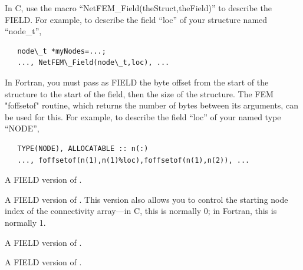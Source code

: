 \documentclass[10pt]{article}
\begin{document}
In C, use the macro ``NetFEM\_Field(theStruct,theField)''
to describe the FIELD.  For example, to describe
the field ``loc'' of your structure named ``node\_t'',

\begin{verbatim}
   node\_t *myNodes=...;
   ..., NetFEM\_Field(node\_t,loc), ...
\end{verbatim}


In Fortran, you must pass as FIELD the byte offset from the start 
of the structure to the start of the field,
then the size of the structure.  The FEM "foffsetof" routine,
which returns the number of bytes between its arguments,
can be used for this.  For example, to describe the field
``loc'' of your named type ``NODE'',

\begin{verbatim}
   TYPE(NODE), ALLOCATABLE :: n(:)
   ..., foffsetof(n(1),n(1)%loc),foffsetof(n(1),n(2)), ...
\end{verbatim}



A FIELD version of .


A FIELD version of .
This version also allows you to control the starting node
index of the connectivity array---in C, this is normally 0;
in Fortran, this is normally 1.


A FIELD version of .



A FIELD version of .
\end{document}
